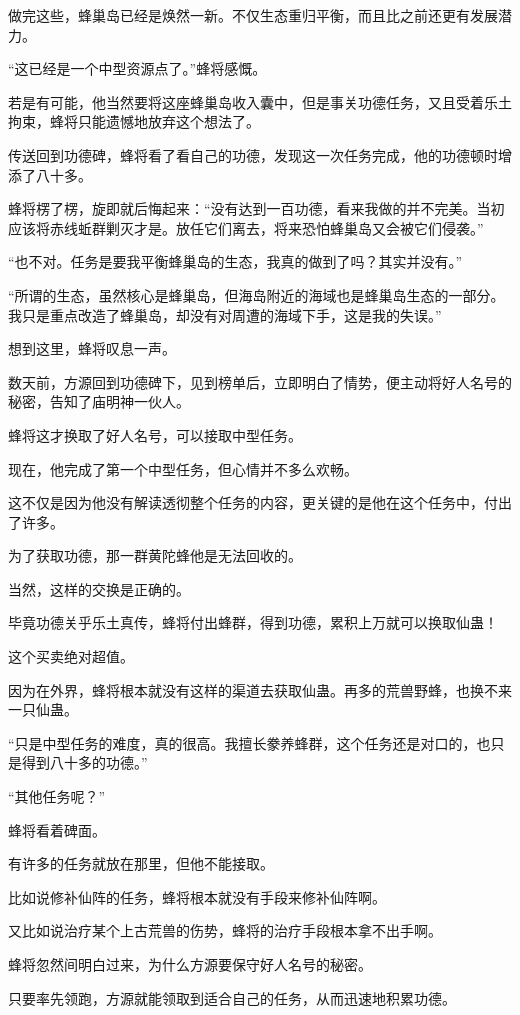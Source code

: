 \begin{this_body}
做完这些，蜂巢岛已经是焕然一新。不仅生态重归平衡，而且比之前还更有发展潜力。

“这已经是一个中型资源点了。”蜂将感慨。

若是有可能，他当然要将这座蜂巢岛收入囊中，但是事关功德任务，又且受着乐土拘束，蜂将只能遗憾地放弃这个想法了。

传送回到功德碑，蜂将看了看自己的功德，发现这一次任务完成，他的功德顿时增添了八十多。

蜂将楞了楞，旋即就后悔起来：“没有达到一百功德，看来我做的并不完美。当初应该将赤线蚯群剿灭才是。放任它们离去，将来恐怕蜂巢岛又会被它们侵袭。”

“也不对。任务是要我平衡蜂巢岛的生态，我真的做到了吗？其实并没有。”

“所谓的生态，虽然核心是蜂巢岛，但海岛附近的海域也是蜂巢岛生态的一部分。我只是重点改造了蜂巢岛，却没有对周遭的海域下手，这是我的失误。”

想到这里，蜂将叹息一声。

数天前，方源回到功德碑下，见到榜单后，立即明白了情势，便主动将好人名号的秘密，告知了庙明神一伙人。

蜂将这才换取了好人名号，可以接取中型任务。

现在，他完成了第一个中型任务，但心情并不多么欢畅。

这不仅是因为他没有解读透彻整个任务的内容，更关键的是他在这个任务中，付出了许多。

为了获取功德，那一群黄陀蜂他是无法回收的。

当然，这样的交换是正确的。

毕竟功德关乎乐土真传，蜂将付出蜂群，得到功德，累积上万就可以换取仙蛊！

这个买卖绝对超值。

因为在外界，蜂将根本就没有这样的渠道去获取仙蛊。再多的荒兽野蜂，也换不来一只仙蛊。

“只是中型任务的难度，真的很高。我擅长豢养蜂群，这个任务还是对口的，也只是得到八十多的功德。”

“其他任务呢？”

蜂将看着碑面。

有许多的任务就放在那里，但他不能接取。

比如说修补仙阵的任务，蜂将根本就没有手段来修补仙阵啊。

又比如说治疗某个上古荒兽的伤势，蜂将的治疗手段根本拿不出手啊。

蜂将忽然间明白过来，为什么方源要保守好人名号的秘密。

只要率先领跑，方源就能领取到适合自己的任务，从而迅速地积累功德。


\end{this_body}
